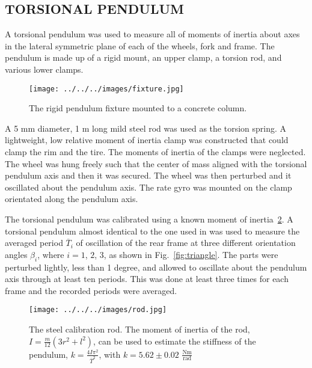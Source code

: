 \documentclass{bmd2010p}
\begin{document}
\subsection{TORSIONAL PENDULUM}
A torsional pendulum was used to measure all of moments of inertia about axes
in the lateral symmetric plane of each of the wheels, fork and frame. The
pendulum is made up of a rigid mount, an upper clamp, a torsion rod, and
various lower clamps.
\begin{figure}[tbp]
    \begin{center}
        \texttt{[image: ../../../images/fixture.jpg]}
    \end{center}
    \caption{The rigid pendulum fixture mounted to a concrete column.}
    \label{fig:fixture}
\end{figure}
A 5 mm diameter, 1 m long mild steel rod was used as the torsion
spring. A lightweight, low relative moment of inertia clamp was constructed
that could clamp the rim and the tire. The moments of inertia of the clamps
were neglected. The wheel was hung freely such that the
center of mass aligned with the torsional pendulum axis and then it was
secured. The wheel was then perturbed and it oscillated about the pendulum
axis. The rate gyro was mounted on the clamp orientated along the pendulum
axis.

The torsional pendulum was calibrated using a known moment of
inertia~\ref{fig:rod}. A torsional pendulum almost identical to the one used in
\cite{Kooijman2006} was used to measure the averaged period $\overline{T}_i$ of
oscillation of the rear frame at three different
orientation angles $\beta_i$, where $i=1$, $2$, $3$, as shown in
Fig.~\ref{fig:triangle}. The parts were perturbed lightly, less than 1 degree,
and allowed to oscillate about the pendulum axis through at least ten periods.
This was done at least three times for each frame and the recorded periods were
averaged.
\begin{figure}[tbp]
    \begin{center}
        \texttt{[image: ../../../images/rod.jpg]}
    \end{center}
    \caption{The steel calibration rod. The moment of inertia of the rod,
    $I=\frac{m}{12}(3r^2+l^2)$, can be used to estimate the stiffness of the
    pendulum, $k=\frac{4I\pi^2}{\overline{T}^2}$, with $k=5.62\pm0.02$ $\frac{\textrm{Nm}}{\textrm{rad}}$}
    \label{fig:rod}
\end{figure}
\end{document}
